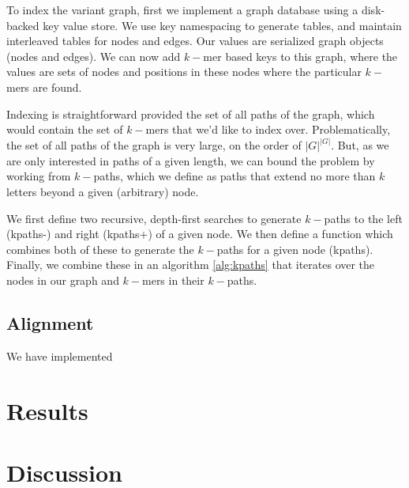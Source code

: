 \documentclass{article}
\begin{document}
To index the variant graph, first we implement a graph database using a disk-backed key value store. We use key namespacing to generate tables, and maintain interleaved tables for nodes and edges. Our values are serialized graph objects (nodes and edges). We can now add $k-$mer based keys to this graph, where the values are sets of nodes and positions in these nodes where the particular $k-$mers are found.

Indexing is straightforward provided the set of all paths of the graph, which would contain the set of $k-$mers that we'd like to index over. Problematically, the set of all paths of the graph is very large, on the order of $|G|^{|G|}$. But, as we are only interested in paths of a given length, we can bound the problem by working from $k-$paths, which we define as paths that extend no more than $k$ letters beyond a given (arbitrary) node.

We first define two recursive, depth-first searches to generate $k-$paths to the left (kpaths-) and right (kpaths+) of a given node. We then define a function which combines both of these to generate the $k-$paths for a given node (kpaths).
Finally, we combine these in an algorithm \ref{alg:kpaths} that iterates over the nodes in our graph and $k-$mers in their $k-$paths.


\subsection{Alignment}

We have implemented 


\section{Results}


\section{Discussion}


{}


\end{document}

